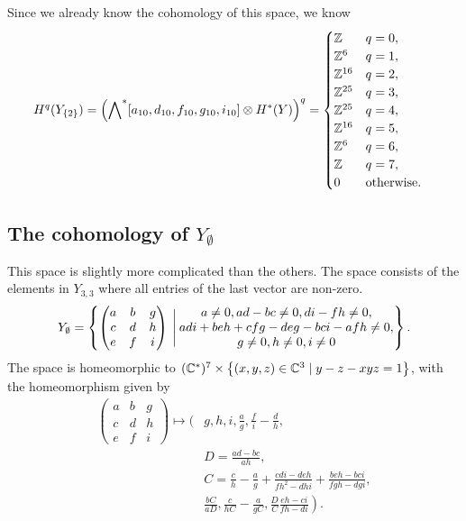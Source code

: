 Since we already know the cohomology of this space, we know
\begin{align*}
  H^q(Y_{\left\{ 2 \right\}}) = 
  \left(\bigwedge\nolimits^*[a_{10},d_{10},f_{10},g_{10},i_{10}]\otimes
  H^*(Y)\right)^q &=
  \begin{cases}
    \mathbb{Z} & q = 0, \\
    \mathbb{Z}^6 & q = 1, \\
    \mathbb{Z}^{16} & q = 2, \\
    \mathbb{Z}^{25} & q = 3, \\
    \mathbb{Z}^{25} & q = 4, \\
    \mathbb{Z}^{16} & q = 5, \\
    \mathbb{Z}^6 & q = 6, \\
    \mathbb{Z} & q = 7, \\
    0 & \text{otherwise}.
  \end{cases}
\end{align*}

\subsection{The cohomology of $Y_{\emptyset}$}

This space is slightly more complicated than the others. The space
consists of the elements in $Y_{3,3}$ where all entries of the last
vector are non-zero.
\[ Y_{\emptyset} = \left\{ 
  \begin{pmatrix}
    a & b & g \\
    c & d & h \\
    e & f & i
  \end{pmatrix} \:\Bigg\vert\:
  \begin{matrix}
    a \neq 0, ad-bc \neq 0, di-fh \neq 0, \\
    adi+beh+cfg-deg-bci-afh \neq 0, \\
    g\neq 0, h\neq 0, i\neq 0
  \end{matrix}  \right\}. \]
The space is homeomorphic to $(\mathbb{C}^*)^7\times \left\{  (x,y,z)\in \mathbb{C}^3
  \mid y-z-xyz = 1 \right\}$, with the homeomorphism given by
\begin{align*}
  \begin{pmatrix}
    a & b & g \\
    c & d & h \\
    e & f & i
  \end{pmatrix} \mapsto \bigg(&g, h, i, \frac{a}{g},
    \frac{f}{i}-\frac{d}{h},\\
  &D=\frac{ad-bc}{ah}, \\
  &C=\frac{c}{h}-\frac{a}{g}+\frac{cdi-deh}{fh^2-dhi} +
  \frac{beh-bci}{fgh-dgi},\\
  &\left.\frac{bC}{aD},\frac{c}{hC}-\frac{a}{gC},
    \frac{D}{C}\frac{eh-ci}{fh-di}\right).
\end{align*}

